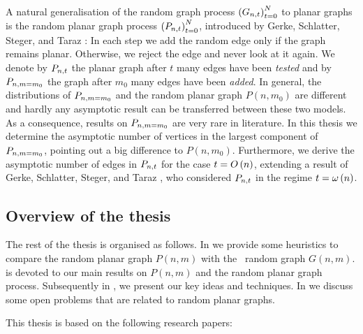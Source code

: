 A natural generalisation of the random graph process $\left(G_{n,t}\right)_{t=0}^N$ to planar graphs is the random planar graph process $\left(P_{n,t}\right)_{t=0}^N$, introduced by Gerke, Schlatter, Steger, and Taraz \cite{GerkeSchlatterStegerTaraz2008}: In each step we add the random edge only if the graph remains planar. Otherwise, we reject the edge and never look at it again. We denote by $P_{n,t}$ the planar graph after $t$ many edges have been {\em tested} and by $P_{n,m=m_0}$ the graph after $m_0$ many edges have been {\em added}. In general, the distributions of $P_{n,m=m_0}$ and the random planar graph $P(n,m_0)$ are different and hardly any asymptotic result can be transferred between these two models. As a consequence, results on $P_{n,m=m_0}$ are very rare in literature. In this thesis we determine the asymptotic number of vertices in the largest component of $P_{n,m=m_0}$, pointing out a big difference to $P(n,m_0)$. Furthermore, we derive the asymptotic number of edges in $P_{n,t}$ for the case $t=O\left(n\right)$, extending a result of Gerke, Schlatter, Steger, and Taraz \cite{GerkeSchlatterStegerTaraz2008}, who considered $P_{n,t}$ in the regime $t=\omega\left(n\right)$.

\subsection{Overview of the thesis}
The rest of the thesis is organised as follows. In  we provide some heuristics to compare the random planar graph $P(n,m)$ with the \ER\ random graph $G(n,m)$.  is devoted to our main results on $P(n,m)$ and the random planar graph process. Subsequently in , we present our key ideas and techniques. In  we discuss some open problems that are related to random planar graphs.

This thesis is based on the following research papers:

